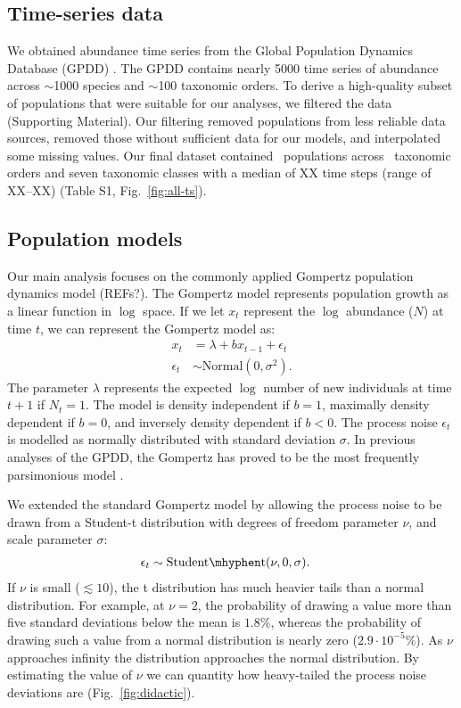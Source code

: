 \subsection{Time-series data}

We obtained abundance time series from the Global Population Dynamics Database
(GPDD) \citep{gpdd2010}. The GPDD contains nearly 5000 time series of abundance
across $\sim$1000 species and $\sim$100 taxonomic orders. To derive
a high-quality subset of populations that were suitable for our analyses, we
filtered the data (Supporting Material). Our filtering removed populations from
less reliable data sources, removed those without sufficient data for our
models, and interpolated some missing values. Our final dataset contained
\NPops~populations across \NOrders~taxonomic orders and seven taxonomic classes
with a median of XX time steps (range of XX--XX) (Table S1,
Fig.~\ref{fig:all-ts}).

\subsection{Population models}

Our main analysis focuses on the commonly applied Gompertz population dynamics
model (REFs?). The Gompertz model represents population growth as a linear
function in $\log$ space. If we let $x_t$ represent the $\log$ abundance ($N$)
at time $t$, we can represent the Gompertz model as:
\begin{align*}
x_t &= \lambda + b x_{t-1} + \epsilon_t\\
\epsilon_t &\sim \mathrm{Normal}(0, \sigma^2).
\end{align*}
The parameter $\lambda$ represents the expected $\log$ number of new
individuals at time $t + 1$ if $N_t = 1$. The model is density independent if
$b = 1$, maximally density dependent if $b = 0$, and inversely density
dependent if $b < 0$. The process noise $\epsilon_t$ is modelled as normally
distributed with standard deviation $\sigma$. In previous analyses of the GPDD,
the Gompertz has proved to be the most frequently parsimonious model
\citep{brook2006}.

We extended the standard Gompertz model by allowing the process noise to be
drawn from a Student-t distribution with degrees of freedom parameter $\nu$,
and scale parameter $\sigma$:
\begin{align*}
\epsilon_t &\sim \mathrm{Student\mhyphen t}(\nu, 0, \sigma).
\end{align*}
If $\nu$ is small ($\lesssim 10$), the t distribution has much heavier tails
than a normal distribution. For example, at $\nu = 2$, the probability of
drawing a value more than five standard deviations below the mean is $1.8$\%,
whereas the probability of drawing such a value from a normal distribution is
nearly zero ($2.9\cdot10^{-5}$\%). As $\nu$ approaches infinity the
distribution approaches the normal distribution. By estimating the value of
$\nu$ we can quantity how heavy-tailed the process noise deviations are
(Fig.~\ref{fig:didactic}).

